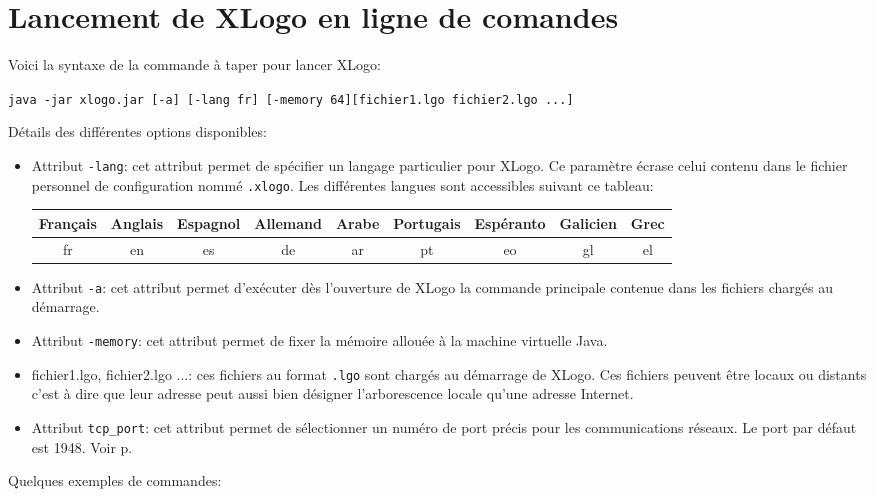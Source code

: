 \chapter{Lancement de XLogo en ligne de comandes}
\noindent
Voici la syntaxe de la commande à taper pour lancer XLogo:
\begin{center}
 \texttt{java -jar xlogo.jar [-a] [-lang fr] [-memory 64][fichier1.lgo fichier2.lgo ...] } 
\end{center}
Détails des différentes options disponibles: \\
\begin{itemize}
 \item Attribut \texttt{-lang}: cet attribut permet de spécifier un langage particulier pour XLogo. Ce paramètre écrase celui contenu dans le fichier personnel de configuration nommé \texttt{.xlogo}. Les différentes langues sont accessibles suivant ce tableau: \\
\begin{center}
\begin{tabular}{|c|c|c|c|c|c|c|c|c|}
\hline
Français & Anglais & Espagnol & Allemand & Arabe & Portugais & Espéranto & Galicien& Grec \\
\hline
fr & en & es & de & ar & pt & eo & gl&el\\
\hline
\end{tabular}
\end{center}
\vspace{0.5cm}
\item Attribut \texttt{-a}: cet attribut permet d'exécuter dès l'ouverture de XLogo la commande principale contenue dans les fichiers chargés au démarrage.\\
\item Attribut \texttt{-memory}: cet attribut permet de fixer la mémoire allouée à la machine virtuelle Java.\\
\item fichier1.lgo, fichier2.lgo ...: ces fichiers au format \texttt{.lgo} sont chargés au démarrage de XLogo. Ces fichiers peuvent être locaux ou distants c'est à dire que leur adresse peut aussi bien désigner l'arborescence locale qu'une adresse Internet.\\
\item Attribut \texttt{tcp\_port}: cet attribut permet de sélectionner un numéro de port précis pour les communications réseaux. Le port par défaut est 1948. Voir p.\pageref{reseau}
\end{itemize}
\vspace{0.5cm}
Quelques exemples de commandes: \\
